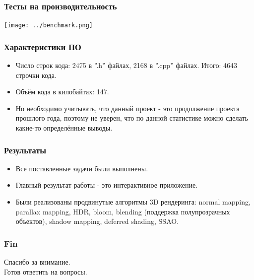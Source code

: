 \documentclass{beamer}
\begin{document}
\begin{frame}
	\frametitle{Тесты на производительность}
	\begin{center}\texttt{[image: ../benchmark.png]}\end{center} 
	
\end{frame}

\begin{frame}
	\frametitle{Характеристики ПО}
	\begin{itemize}
		\item<1-> Число строк кода: 2475 в ''.h'' файлах, 2168 в ''.cpp'' файлах. Итого: 4643 строчки кода.
		\item<1-> Объём кода в килобайтах: 147.
		\item<1-> Но необходимо учитывать, что данный проект - это продолжение проекта прошлого года, поэтому не уверен, что по данной статистике можно сделать какие-то определённые выводы.
	\end{itemize} 
\end{frame}

\begin{frame}
	\frametitle{Результаты}
	\begin{itemize}
		\item<1-> Все поставленные задачи были выполнены.
		\item<1-> Главный результат работы - это интерактивное приложение. 
		\item<1-> Были реализованы продвинутые алгоритмы 3D рендеринга: normal mapping, parallax mapping, HDR, bloom, blending (поддержка полупрозрачных объектов), shadow mapping, deferred shading, SSAO.
	\end{itemize}
\end{frame}
	
\begin{frame}
	\frametitle{Fin}
	Спасибо за внимание. \\
	Готов ответить на вопросы.
\end{frame}
	
\end{document}

